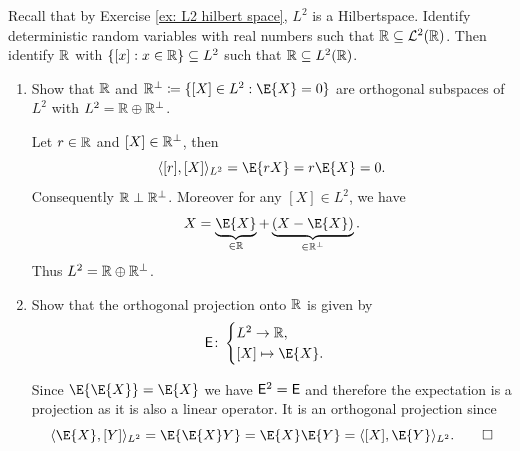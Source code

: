 \begin{exercise}
    \label{ex: projection in L2}
    Recall that by Exercise \ref{ex: L2 hilbert space}, \(L^2\) is a Hilbertspace.
    Identify deterministic random variables with real numbers  such that \(\mathbb{R}
    \subseteq \mathcal{L}^2(\mathbb{R})\). Then identify \(\mathbb{R}\) with \(\{[x]:
    x\in\mathbb{R}\} \subseteq L^2\) such that \(\mathbb{R} \subseteq L^2(\mathbb{R})\).
    \begin{enumerate}[label=(\alph*), noitemsep]
        \item Show that \(\mathbb{R}\) and \(\real^\perp \coloneq \set{[X] \in L^2 :
        \E{X}=0}\) are orthogonal subspaces of \(L^2\) with \(L^2 = \mathbb{R}
        \oplus \mathbb{R}^\perp\).
        \begin{solution}
            Let \(r\in \mathbb{R}\) and \([X]\in \mathbb{R}^\perp\), then
            \[
                \scp{[r], [X]}_{L^2} = \E{rX} = r\E{X} = 0.
            \]
            Consequently \(\mathbb{R} \perp \mathbb{R}^\perp\).  Moreover for any \([X]
            \in L^2\), we have
            \[
                X = \underbrace{\E{X}}_{\in \real} + \underbrace{(X-\E{X})}_{\in \real^\perp}.
            \]
            Thus \(L^2 = \mathbb{R} \oplus \mathbb{R}^\perp\).
        \end{solution}

        \item Show that the orthogonal projection onto \(\mathbb{R}\) is given by
        \[
            \eSym \colon \begin{cases}
                L^2 \to \real,
                \\
                [X] \mapsto \E{X}.
            \end{cases}
        \]
        \begin{solution}
            Since \(\E{\E{X}} = \E{X}\) we have \(\mathsf{E}^2 = \mathsf{E}\)
            and therefore the expectation is a projection as it is also a
            linear operator. It is an orthogonal projection since
            \[
                \scp{\E{X}, [Y]}_{L^2} = \E{\E{X}Y} = \E{X}\E{Y} = \scp{[X], \E{Y}}_{L^2}.
                \qedhere
            \]
        \end{solution}


\end{enumerate}
\end{exercise}
